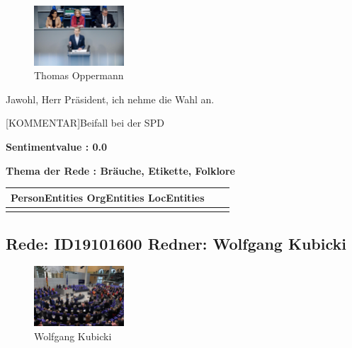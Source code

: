 \documentclass[a4paper,11pt]{article}
\begin{document}
\begin{figure}[ht]

\centering

\includegraphics[width=0.3\textwidth]{Thomas_Oppermann.jpg}

\caption{Thomas Oppermann}

\end{figure}

Jawohl, Herr Präsident, ich nehme die Wahl an.

[KOMMENTAR]Beifall bei der SPD


\textbf{Sentimentvalue : 0.0}

\textbf{Thema der Rede : Bräuche, Etikette, Folklore}
\vspace*{1cm}

\begin{table}[ht]
\centering
\begin{tabular}{||c | c | c||}
\hline
PersonEntities  OrgEntities  LocEntities \\ 

\hline\hline
\makecell{} 
\makecell{} 
\makecell{}\\
\hline
\end{tabular}
\end{table}
\clearpage


\subsection{Rede: ID19101600  Redner: Wolfgang Kubicki}

\begin{figure}[ht]

\centering

\includegraphics[width=0.3\textwidth]{Wolfgang_Kubicki.jpg}

\caption{Wolfgang Kubicki}

\end{figure}
\end{document}
